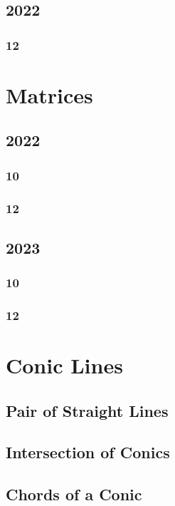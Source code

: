 \documentclass[11pt]{book}
\begin{document}
\section{2022}
\subsection{12}

\chapter{Matrices}
\section{2022}
\subsection{10}

\subsection{12}

\section{2023}
\subsection{10}

\subsection{12}

%


% 
\backmatter
\appendix
\iffalse
\chapter{Conic Lines}
\section{Pair of Straight Lines}
%

\section{Intersection of Conics}

\section{ Chords of a Conic}

\end{document}
